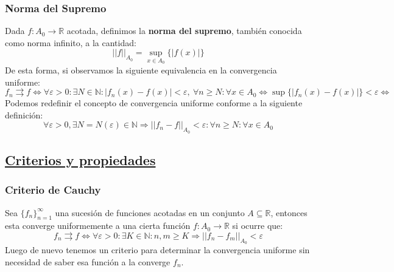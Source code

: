 \documentclass[10pt,a4paper,openright]{book}
\begin{document}
\subsubsection*{Norma del Supremo}
Dada $f: A_0 \to \mathbb{R}$ acotada, definimos la \textbf{norma del supremo}, también conocida como norma infinito, a la cantidad:
$$||f||_{A_0} = \underset{x \in A_0}{\sup} \{|f(x)|\}$$
De esta forma, si observamos la siguiente equivalencia en la convergencia uniforme:
$$f_n \rightrightarrows f \Leftrightarrow \forall \varepsilon> 0: \exists N\in \mathbb N:|f_n(x)-f(x)|<\varepsilon , \  \forall n\geq N: \forall x \in A_0 \Leftrightarrow \sup \{|f_n(x)-f(x)|\}<\varepsilon \Leftrightarrow$$
Podemos redefinir el concepto de convergencia uniforme conforme a la siguiente definición:
$$\forall \varepsilon > 0, \exists N = N(\varepsilon) \in \mathbb{N} \Rightarrow ||f_n - f|| _{A_0}< \varepsilon : \forall n \geq N : \forall x \in A_0 $$

\subsection*{\underline{Criterios y propiedades}}
\subsubsection*{Criterio de Cauchy}
Sea $\{f_n\}_{n=1}^\infty$ una sucesión de funciones acotadas en un conjunto $A\subseteq \mathbb R$, entonces esta converge uniformemente a una cierta función $f: A_0\rightarrow \mathbb R$ si ocurre que:
$$f_n\rightrightarrows f \Leftrightarrow \forall \varepsilon > 0: \exists K \in \mathbb N: n,m\geq K\Rightarrow ||f_n-f_m||_{A_0}<\varepsilon$$
Luego de nuevo tenemos un criterio para determinar la convergencia uniforme sin necesidad de saber esa función a la converge $f_n$.
\end{document}
